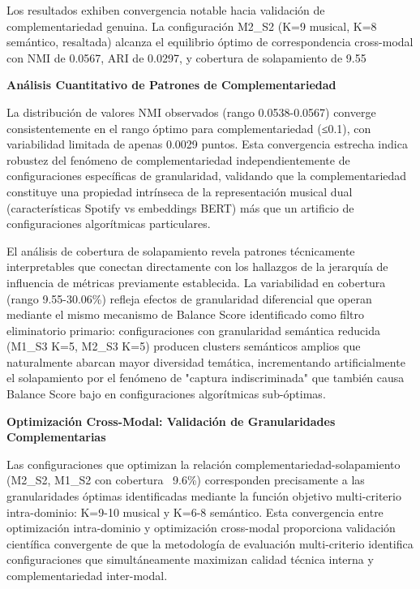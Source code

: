 \documentclass[12pt,a4paper]{report}
\begin{document}
Los resultados exhiben convergencia notable hacia validación de complementariedad genuina. La configuración M2\_S2 (K=9 musical, K=8 semántico, resaltada) alcanza el equilibrio óptimo de correspondencia cross-modal con NMI de 0.0567, ARI de 0.0297, y cobertura de solapamiento de 9.55%

\textbf{Análisis Cuantitativo de Patrones de Complementariedad}

La distribución de valores NMI observados (rango 0.0538-0.0567) converge consistentemente en el rango óptimo para complementariedad (≤0.1), con variabilidad limitada de apenas 0.0029 puntos. Esta convergencia estrecha indica robustez del fenómeno de complementariedad independientemente de configuraciones específicas de granularidad, validando que la complementariedad constituye una propiedad intrínseca de la representación musical dual (características Spotify vs embeddings BERT) más que un artificio de configuraciones algorítmicas particulares.

El análisis de cobertura de solapamiento revela patrones técnicamente interpretables que conectan directamente con los hallazgos de la jerarquía de influencia de métricas previamente establecida. La variabilidad en cobertura (rango 9.55-30.06\%) refleja efectos de granularidad diferencial que operan mediante el mismo mecanismo de Balance Score identificado como filtro eliminatorio primario: configuraciones con granularidad semántica reducida (M1\_S3 K=5, M2\_S3 K=5) producen clusters semánticos amplios que naturalmente abarcan mayor diversidad temática, incrementando artificialmente el solapamiento por el fenómeno de "captura indiscriminada" que también causa Balance Score bajo en configuraciones algorítmicas sub-óptimas.

\textbf{Optimización Cross-Modal: Validación de Granularidades Complementarias}

Las configuraciones que optimizan la relación complementariedad-solapamiento (M2\_S2, M1\_S2 con cobertura ~9.6\%) corresponden precisamente a las granularidades óptimas identificadas mediante la función objetivo multi-criterio intra-dominio: K=9-10 musical y K=6-8 semántico. Esta convergencia entre optimización intra-dominio y optimización cross-modal proporciona validación científica convergente de que la metodología de evaluación multi-criterio identifica configuraciones que simultáneamente maximizan calidad técnica interna y complementariedad inter-modal.
\end{document}

